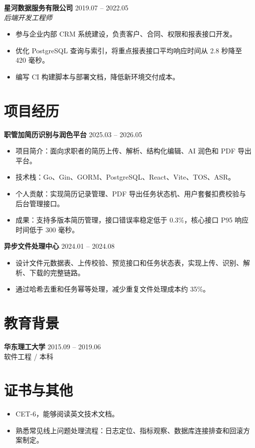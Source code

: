\documentclass[11pt,a4paper]{article}
\begin{document}
\textbf{星河数据服务有限公司} \hfill 2019.07 -- 2022.05\\
\textit{后端开发工程师}
\begin{itemize}
  \item 参与企业内部 CRM 系统建设，负责客户、合同、权限和报表接口开发。
  \item 优化 PostgreSQL 查询与索引，将重点报表接口平均响应时间从 2.8 秒降至 420 毫秒。
  \item 编写 CI 构建脚本与部署文档，降低新环境交付成本。
\end{itemize}

\section{项目经历}
\textbf{职管加简历识别与润色平台} \hfill 2025.03 -- 2026.05
\begin{itemize}
  \item 项目简介：面向求职者的简历上传、解析、结构化编辑、AI 润色和 PDF 导出平台。
  \item 技术栈：Go、Gin、GORM、PostgreSQL、React、Vite、TOS、ASR。
  \item 个人贡献：实现简历记录管理、PDF 导出任务状态机、用户套餐扣费校验与后台管理接口。
  \item 成果：支持多版本简历管理，接口错误率稳定低于 0.3\%，核心接口 P95 响应时间低于 300 毫秒。
\end{itemize}

\textbf{异步文件处理中心} \hfill 2024.01 -- 2024.08
\begin{itemize}
  \item 设计文件元数据表、上传校验、预览接口和任务状态表，实现上传、识别、解析、下载的完整链路。
  \item 通过哈希去重和任务幂等处理，减少重复文件处理成本约 35\%。
\end{itemize}

\section{教育背景}
\textbf{华东理工大学} \hfill 2015.09 -- 2019.06\\
软件工程 / 本科

\section{证书与其他}
\begin{itemize}
  \item CET-6，能够阅读英文技术文档。
  \item 熟悉常见线上问题处理流程：日志定位、指标观察、数据库连接排查和回滚方案制定。
\end{itemize}
\end{document}
